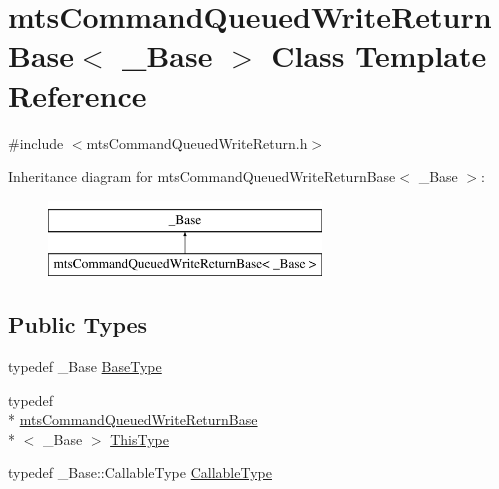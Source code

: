 \hypertarget{classmts_command_queued_write_return_base}{\section{mts\-Command\-Queued\-Write\-Return\-Base$<$ \-\_\-\-Base $>$ Class Template Reference}
\label{classmts_command_queued_write_return_base}
}


{\ttfamily \#include $<$mts\-Command\-Queued\-Write\-Return.\-h$>$}

Inheritance diagram for mts\-Command\-Queued\-Write\-Return\-Base$<$ \-\_\-\-Base $>$\-:\begin{figure}[H]
\begin{center}
\leavevmode
\includegraphics[height=2.000000cm]{db/d04/classmts_command_queued_write_return_base}
\end{center}
\end{figure}
\subsection*{Public Types}
\begin{DoxyCompactItemize}
\item 
typedef \-\_\-\-Base \hyperlink{classmts_command_queued_write_return_base_a1c16e3d09d9bb0071bb50f31ba81b4a8}{Base\-Type}
\item 
typedef \\*
\hyperlink{classmts_command_queued_write_return_base}{mts\-Command\-Queued\-Write\-Return\-Base}\\*
$<$ \-\_\-\-Base $>$ \hyperlink{classmts_command_queued_write_return_base_af2f07528dc98cd88ab385e995f95a368}{This\-Type}
\item 
typedef \-\_\-\-Base\-::\-Callable\-Type \hyperlink{classmts_command_queued_write_return_base_aa8635b9bab77a8e15f53f9f80415c420}{Callable\-Type}
\end{DoxyCompactItemize}
